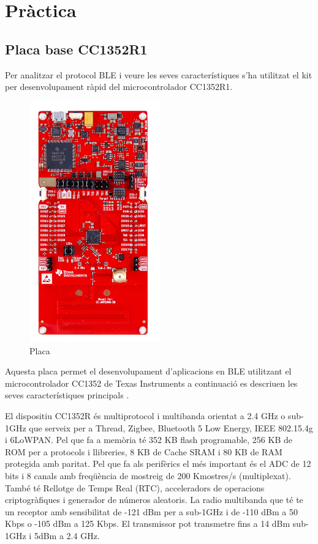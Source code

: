 \chapter{Pràctica}
\section{Placa base CC1352R1}
Per analitzar el protocol BLE i veure les seves característiques s'ha utilitzat el kit per desenvolupament ràpid del microcontrolador CC1352R1.
\begin{figure}[h!]
	\begin{center}
		\includegraphics[width=0.5\textwidth]{./images/launchxl-cc1352r1.jpg}
		\caption{Placa \cite{placa}}
	\end{center}
\end{figure}

Aquesta placa permet el desenvolupament d'aplicacions en BLE utilitzant el microcontrolador CC1352 de Texas Instruments a continuació es descriuen les seves característiques principals \cite{placa_datasheet}.

El dispositiu CC1352R és multiprotocol i multibanda orientat a 2.4 GHz o sub-1GHz que serveix per a Thread, Zigbee, Bluetooth 5 Low Energy, IEEE 802.15.4g i 6LoWPAN. Pel que fa a memòria té 352 KB flash programable, 256 KB de ROM per a protocols i llibreries, 8 KB de Cache SRAM i 80 KB de RAM protegida amb paritat.
Pel que fa als perifèrics el més important és el ADC de 12 bits i 8 canals amb freqüència de mostreig de 200 Kmostres/s (multiplexat). També té Rellotge de Temps Real (RTC), acceleradors de operacions criptogràfiques i generador de números aleatoris.
La radio multibanda que té te un receptor amb sensibilitat de -121 dBm per a sub-1GHz i de -110 dBm a 50 Kbps o -105 dBm a 125 Kbps. El transmissor pot transmetre fins a 14 dBm sub-1GHz i 5dBm a 2.4 GHz.



